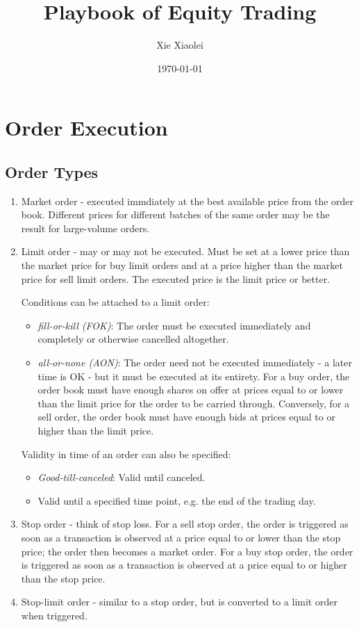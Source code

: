 \documentclass{report}
\title{Playbook of Equity Trading}
\author{Xie Xiaolei}
\date{\today}
\begin{document}
\maketitle

\chapter{Order Execution}
\section{Order Types}
\begin{enumerate}
\item Market order - executed immdiately at the best available price from the order book.
  Different prices for different batches of the same order may be the result for large-volume orders.
  
\item Limit order - may or may not be executed. Must be set at a lower price than the market price
  for buy limit orders and at a price higher than the market price for sell limit orders.
  The executed price is the limit price or better.

  Conditions can be attached to a limit order:
  \begin{itemize}
  \item {\it fill-or-kill (FOK)}: The order must be executed immediately and completely or otherwise
    cancelled altogether.
  \item {\it all-or-none (AON)}: The order need not be executed immediately - a later time is OK - but it must
    be executed at its entirety. For a buy order, the order book must have enough shares on offer at prices equal to
    or lower than the limit price for the order to be carried through.
    Conversely, for a sell order, the order book must have enough bids at prices equal to or higher than the limit price.
  \end{itemize}

  Validity in time of an order can also be specified:
  \begin{itemize}
  \item {\it Good-till-canceled}: Valid until canceled.
  \item Valid until a specified time point, e.g. the end of the trading day.
  \end{itemize}

\item Stop order - think of stop loss.
  For a sell stop order, the order is triggered as soon as a transaction is observed at
  a price equal to or lower than the stop price; the order then becomes a market order.
  For a buy stop order, the order is triggered as soon as a transaction is observed at
  a price equal to or higher than the stop price.
  
\item Stop-limit order - similar to a stop order, but is converted to a limit order when triggered.

\end{enumerate}
\end{document}
